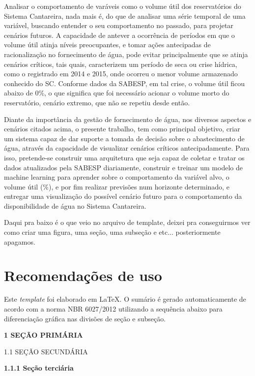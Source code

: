 Analisar o comportamento de varáveis como o volume útil dos reservatórios do Sistema Cantareira, nada mais é, do que de analisar uma série temporal de uma variável, buscando entender o seu comportamento no passado, para projetar cenários futuros. A capacidade de antever a ocorrência de períodos em que o volume útil atinja níveis preocupantes, e tomar ações antecipadas de racionalização no fornecimento de água, pode evitar principalmente que se atinja cenários críticos, tais quais, caracterizem um período de seca ou crise hídrica, como o registrado em 2014 e 2015, onde ocorreu o menor volume armazenado conhecido do SC. Conforme dados da SABESP, em tal crise, o volume útil ficou abaixo de 0\%, o que significa que foi necessário acionar o volume morto do reservatório, cenário extremo, que não se repetiu desde então. 

Diante da importância da gestão de fornecimento de água, nos diversos aspectos e cenários citados acima, o presente trabalho, tem como principal objetivo, criar um sistema capaz de dar suporte a tomada de decisão sobre o abastecimento de água, através da capacidade de visualizar cenários críticos antecipadamente. Para isso, pretende-se construir uma arquitetura que seja capaz de coletar e tratar os dados atualizados pela SABESP diariamente, construir e treinar um modelo de machine learning para aprender sobre o comportamento da variável alvo, o volume útil (\%), e por fim realizar previsões num horizonte determinado, e entregar uma visualização do possível cenário futuro para o comportamento da disponibilidade de água no Sistema Cantareira. 


Daqui pra baixo é o que veio no arquivo de template, deixei pra conseguirmos ver como criar uma figura, uma seção, uma subseção e etc... posteriormente apagamos. 

\section{Recomendações de uso}
Este \textit{template} foi elaborado em \LaTeX. O sumário é gerado automaticamente de acordo com a norma NBR 6027/2012 utilizando a sequência abaixo para diferenciação gráfica nas divisões de seção e subseção.

\vspace{12pt}

\textbf{1 SEÇÃO PRIMÁRIA}

1.1 SEÇÃO SECUNDÁRIA

\textbf{1.1.1 Seção terciária}

